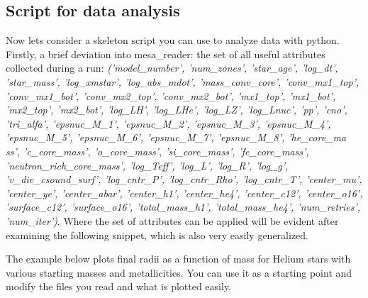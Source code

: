 \documentclass[12pt,hidelinks]{article}
\begin{document}
	\subsection{Script for data analysis}
            Now lets consider a skeleton script you can use to analyze data with python. Firstly, a brief deviation into mesa\_reader: the set of all useful attributes collected during a run: \emph{('model\_number', 'num\_zones', 'star\_age', 'log\_dt', 'star\_mass', 'log\_xmstar', 'log\_abs\_mdot', 'mass\_conv\_core', 'conv\_mx1\_top', 'conv\_mx1\_bot', 'conv\_mx2\_top', 'conv\_mx2\_bot', 'mx1\_top', 'mx1\_bot', 'mx2\_top', 'mx2\_bot', 'log\_LH', 'log\_LHe', 'log\_LZ', 'log\_Lnuc', 'pp', 'cno', 'tri\_alfa', 'epsnuc\_M\_1', 'epsnuc\_M\_2', 'epsnuc\_M\_3', 'epsnuc\_M\_4', 'epsnuc\_M\_5', 'epsnuc\_M\_6', 'epsnuc\_M\_7', 'epsnuc\_M\_8', 'he\_core\_ma    ss', 'c\_core\_mass', 'o\_core\_mass', 'si\_core\_mass', 'fe\_core\_mass', 'neutron\_rich\_core\_mass', 'log\_Teff', 'log\_L', 'log\_R', 'log\_g', 'v\_div\_csound\_surf', 'log\_cntr\_P', 'log\_cntr\_Rho', 'log\_cntr\_T', 'center\_mu', 'center\_ye', 'center\_abar', 'center\_h1', 'center\_he4', 'center\_c12', 'center\_o16', 'surface\_c12', 'surface\_o16', 'total\_mass\_h1', 'total\_mass\_he4', 'num\_retries', 'num\_iter')}. Where the set of attributes can be applied will be evident after examining the following snippet, which is also very easily generalized. \par
            \vspace{0.5cm}
            The example below plots final radii as a function of mass for Helium stars with various starting masses and metallicities. You can use it as a starting point and modify the files you read and what is plotted easily.
\end{document}
